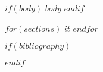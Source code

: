 \documentclass[varwidth,border={0 1pt}]{standalone}
\begin{document}
\nopagecolor

$if(body)$
$body$
$endif$

$for(sections)$
$it$
$endfor$

$if(bibliography)$
\clearpage


$endif$
\end{document}
